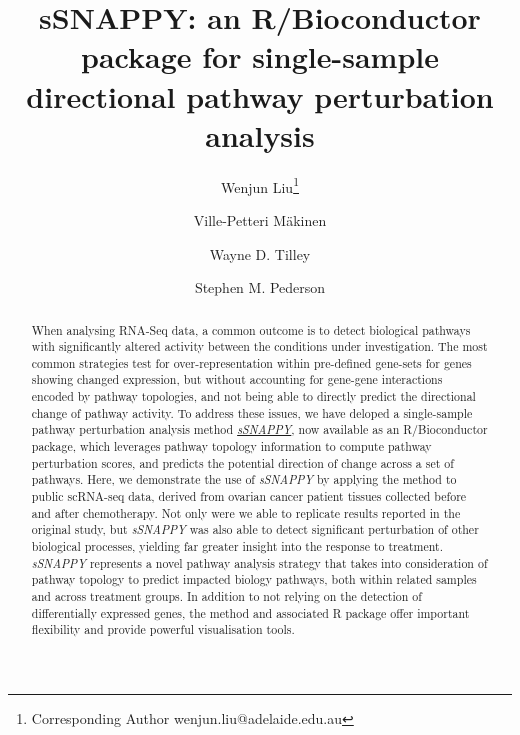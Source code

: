 \documentclass[9pt,a4paper,]{extarticle}
\begin{document}
\pagestyle{front}

\title{sSNAPPY: an R/Bioconductor package for single-sample directional pathway perturbation analysis}

\author[1]{Wenjun Liu\thanks{\ttfamily Corresponding Author wenjun.liu@adelaide.edu.au}}
\author[2,3]{Ville-Petteri Mäkinen}
\author[1]{Wayne D. Tilley}
\author[1,4,5]{Stephen M. Pederson}

\maketitle
\thispagestyle{front}

\begin{abstract}
When analysing RNA-Seq data, a common outcome is to detect biological pathways with significantly altered activity between the conditions under investigation. The most common strategies test for over-representation within pre-defined gene-sets for genes showing changed expression\citep{Subramanian2005-lx, Young2010-jw}, but without accounting for gene-gene interactions encoded by pathway topologies, and not being able to directly predict the directional change of pathway activity. To address these issues, we have deloped a single-sample pathway perturbation analysis method \href{https://bioconductor.org/packages/sSNAPPY}{\emph{sSNAPPY}}, now available as an R/Bioconductor package, which leverages pathway topology information to compute pathway perturbation scores, and predicts the potential direction of change across a set of pathways. Here, we demonstrate the use of \emph{sSNAPPY} by applying the method to public scRNA-seq data, derived from ovarian cancer patient tissues collected before and after chemotherapy. Not only were we able to replicate results reported in the original study, but \emph{sSNAPPY} was also able to detect significant perturbation of other biological processes, yielding far greater insight into the response to treatment. \emph{sSNAPPY} represents a novel pathway analysis strategy that takes into consideration of pathway topology to predict impacted biology pathways, both within related samples and across treatment groups. In addition to not relying on the detection of differentially expressed genes, the method and associated R package offer important flexibility and provide powerful visualisation tools.
\end{abstract}
\end{document}
